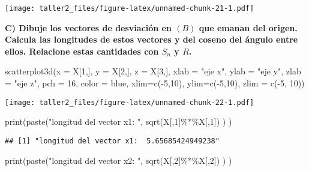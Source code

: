 \documentclass[
]{article}
\newenvironment{Shaded}{\begin{snugshade}}{\end{snugshade}}
\newcommand{\AttributeTok}[1]{\textcolor[rgb]{0.77,0.63,0.00}{#1}}
\newcommand{\DecValTok}[1]{\textcolor[rgb]{0.00,0.00,0.81}{#1}}
\newcommand{\FunctionTok}[1]{\textcolor[rgb]{0.00,0.00,0.00}{#1}}
\newcommand{\NormalTok}[1]{#1}
\newcommand{\SpecialCharTok}[1]{\textcolor[rgb]{0.00,0.00,0.00}{#1}}
\newcommand{\StringTok}[1]{\textcolor[rgb]{0.31,0.60,0.02}{#1}}
\begin{document}
\texttt{[image: taller2\_files/figure-latex/unnamed-chunk-21-1.pdf]}

\textbf{C) Dibuje los vectores de desviación en \((B)\) que emanan del
origen. Calcula las longitudes de estos vectores y del coseno del ángulo
entre ellos. Relacione estas cantidades con \(S_{n}\) y \(R\).}

\begin{Shaded}
\begin{Highlighting}[]
\FunctionTok{scatterplot3d}\NormalTok{(}\AttributeTok{x =}\NormalTok{ X[}\DecValTok{1}\NormalTok{,], }\AttributeTok{y =}\NormalTok{ X[}\DecValTok{2}\NormalTok{,], }\AttributeTok{z =}\NormalTok{ X[}\DecValTok{3}\NormalTok{,], }\AttributeTok{xlab =} \StringTok{"eje x"}\NormalTok{, }\AttributeTok{ylab =} \StringTok{"eje y"}\NormalTok{,}
              \AttributeTok{zlab =} \StringTok{"eje z"}\NormalTok{, }\AttributeTok{pch =} \DecValTok{16}\NormalTok{, }\AttributeTok{color =} \StringTok{\textquotesingle{}blue\textquotesingle{}}\NormalTok{, }
              \AttributeTok{xlim=}\FunctionTok{c}\NormalTok{(}\SpecialCharTok{{-}}\DecValTok{5}\NormalTok{,}\DecValTok{10}\NormalTok{), }\AttributeTok{ylim=}\FunctionTok{c}\NormalTok{(}\SpecialCharTok{{-}}\DecValTok{5}\NormalTok{,}\DecValTok{10}\NormalTok{), }\AttributeTok{zlim =} \FunctionTok{c}\NormalTok{(}\SpecialCharTok{{-}}\DecValTok{5}\NormalTok{, }\DecValTok{10}\NormalTok{))}
\end{Highlighting}
\end{Shaded}

\texttt{[image: taller2\_files/figure-latex/unnamed-chunk-22-1.pdf]}

\begin{Shaded}
\begin{Highlighting}[]
\FunctionTok{print}\NormalTok{(}\FunctionTok{paste}\NormalTok{(}\StringTok{"longitud del vector x1: "}\NormalTok{, }\FunctionTok{sqrt}\NormalTok{(X[,}\DecValTok{1}\NormalTok{]}\SpecialCharTok{\%*\%}\NormalTok{X[,}\DecValTok{1}\NormalTok{]) ) ) }
\end{Highlighting}
\end{Shaded}

\begin{verbatim}
## [1] "longitud del vector x1:  5.65685424949238"
\end{verbatim}

\begin{Shaded}
\begin{Highlighting}[]
\FunctionTok{print}\NormalTok{(}\FunctionTok{paste}\NormalTok{(}\StringTok{"longitud del vector x2: "}\NormalTok{, }\FunctionTok{sqrt}\NormalTok{(X[,}\DecValTok{2}\NormalTok{]}\SpecialCharTok{\%*\%}\NormalTok{X[,}\DecValTok{2}\NormalTok{]) ) ) }
\end{Highlighting}
\end{Shaded}
\end{document}
